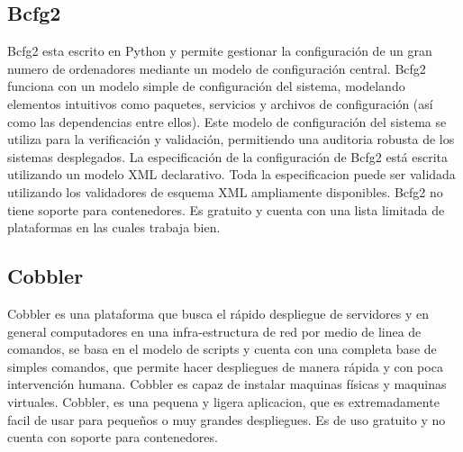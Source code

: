\subsection{Bcfg2}
Bcfg2 esta escrito en Python y permite gestionar la configuración de un gran numero de ordenadores mediante un modelo de configuración central. Bcfg2 funciona con un modelo simple de configuración del sistema, modelando elementos intuitivos como paquetes, servicios y archivos de configuración (así como las dependencias entre ellos). Este modelo de configuración del sistema se utiliza para la verificación  y validación, permitiendo una auditoria robusta de los sistemas desplegados. La especificación de la configuración de Bcfg2 está escrita utilizando un modelo XML declarativo. Toda la especificacion puede ser validada utilizando los validadores de esquema XML ampliamente disponibles. Bcfg2 no tiene soporte para contenedores. Es gratuito y cuenta con una lista limitada de plataformas en las cuales trabaja bien.\cite{bdfg215}

\subsection{Cobbler}
Cobbler es una plataforma que busca el rápido despliegue de servidores y en general computadores en una infra-estructura de red por medio de linea de comandos, se basa en el modelo de scripts y cuenta con una completa base de simples comandos, que permite hacer despliegues de manera rápida y con poca intervención humana. Cobbler es capaz de instalar maquinas físicas y maquinas virtuales. Cobbler, es una pequena y ligera aplicacion, que es extremadamente facil de usar para pequeños o muy grandes despliegues. Es de uso gratuito y no cuenta con soporte para contenedores. \cite{Cobbler15}

